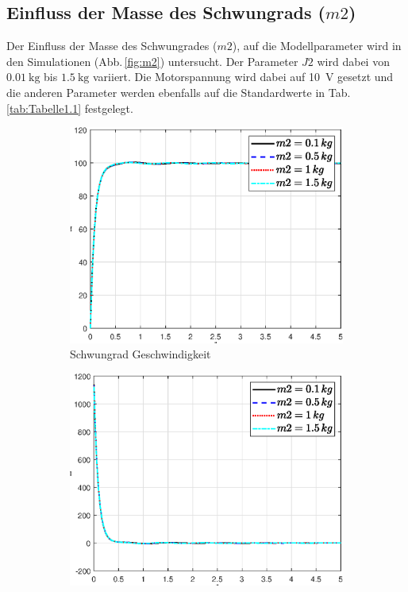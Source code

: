  \subsection*{Einfluss der Masse des Schwungrads ($m2$)}
 Der Einfluss der Masse des Schwungrades ($m2$), auf die Modellparameter wird in den Simulationen (Abb.\,\ref{fig:m2}) untersucht. 
 Der Parameter $J2$ wird dabei von $\SI{0.01}{\kg}$ bis $\SI{1.5}{\kg}$ variiert.
 Die Motorspannung wird dabei auf \SI{10}{\volt} gesetzt und die anderen Parameter werden ebenfalls auf die Standardwerte in Tab.\,\ref{tab:Tabelle1.1} festgelegt.\\
 \begin{figure}
    \captionsetup[subfigure]{justification=centering,font=footnotesize}
    \begin{subfigure}[b]{0.49\linewidth}
        \includegraphics[width=\linewidth]{Bilder/5_sensi/fig/m2/phi_punkt.eps}
        \caption{Schwungrad Geschwindigkeit}
        \label{fig:m2_phi_punkt}
    \end{subfigure}
    \begin{subfigure}[b]{0.49 \linewidth}
        \includegraphics[width=\linewidth]{Bilder/5_sensi/fig/m2/phi_punkt_punkt.eps}

\end{subfigure}
\end{figure}
